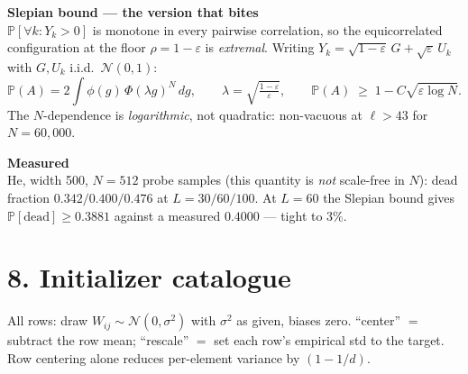 \documentclass[10pt,a4paper]{article}
\newcommand{\hd}[1]{\vspace{1.5mm}\noindent\textbf{\color{NavyBlue}#1}\vspace{0.6mm}\\}
\begin{document}
\hd{Slepian bound --- the version that bites}
$\mathbb P[\forall k: Y_k>0]$ is monotone in every pairwise correlation, so the equicorrelated
configuration at the floor $\rho=1-\varepsilon$ is \emph{extremal}. Writing
$Y_k=\sqrt{1-\varepsilon}\,G+\sqrt\varepsilon\,U_k$ with $G,U_k$ i.i.d.\ $\mathcal N(0,1)$:
\[
  \mathbb P(A)=2\!\int\!\phi(g)\,\Phi(\lambda g)^{N}\,dg,\qquad
  \lambda=\sqrt{\tfrac{1-\varepsilon}{\varepsilon}},
  \qquad
  \mathbb P(A)\;\ge\;1-C\sqrt{\varepsilon\log N}.
\]
The $N$-dependence is \emph{logarithmic}, not quadratic: non-vacuous at $\ell>43$ for $N=60{,}000$.

\hd{Measured}
He, width 500, $N=512$ probe samples (this quantity is \emph{not} scale-free in $N$):
dead fraction $0.342 / 0.400 / 0.476$ at $L=30/60/100$. At $L=60$ the Slepian bound gives
$\mathbb P[\text{dead}]\ge0.3881$ against a measured $0.4000$ --- tight to $3\%$.

\newpage
\section*{8. Initializer catalogue}

All rows: draw $W_{ij}\sim\mathcal N(0,\sigma^2)$ with $\sigma^2$ as given, biases zero.
``center'' $=$ subtract the row mean; ``rescale'' $=$ set each row's empirical std to the target.
Row centering alone reduces per-element variance by $(1-1/d)$.
\end{document}
